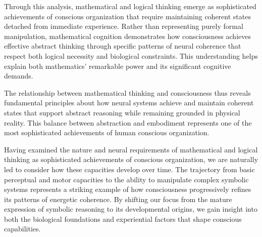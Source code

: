 Through this analysis, mathematical and logical thinking emerge as sophisticated achievements of conscious organization that require maintaining coherent states detached from immediate experience. Rather than representing purely formal manipulation, mathematical cognition demonstrates how consciousness achieves effective abstract thinking through specific patterns of neural coherence that respect both logical necessity and biological constraints. This understanding helps explain both mathematics' remarkable power and its significant cognitive demands.

The relationship between mathematical thinking and consciousness thus reveals fundamental principles about how neural systems achieve and maintain coherent states that support abstract reasoning while remaining grounded in physical reality. This balance between abstraction and embodiment represents one of the most sophisticated achievements of human conscious organization.

Having examined the nature and neural requirements of mathematical and logical thinking as sophisticated achievements of conscious organization, we are naturally led to consider how these capacities develop over time. The trajectory from basic perceptual and motor capacities to the ability to manipulate complex symbolic systems represents a striking example of how consciousness progressively refines its patterns of energetic coherence. By shifting our focus from the mature expression of symbolic reasoning to its developmental origins, we gain insight into both the biological foundations and experiential factors that shape conscious capabilities.
